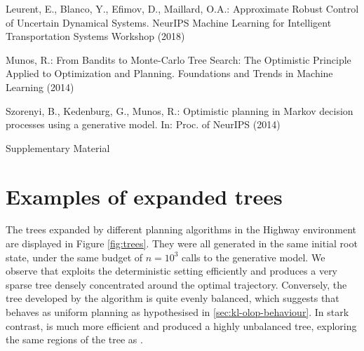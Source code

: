 \documentclass[runningheads]{llncs}
\begin{document}
\begin{thebibliography}{10}
Leurent, E., Blanco, Y., Efimov, D., Maillard, O.A.: {Approximate Robust
  Control of Uncertain Dynamical Systems}. NeurIPS Machine Learning for
  Intelligent Transportation Systems Workshop  (2018)

Munos, R.: {From Bandits to Monte-Carlo Tree Search: The Optimistic Principle
  Applied to Optimization and Planning}. Foundations and
  Trends{\textregistered} in Machine Learning  (2014)

Szorenyi, B., Kedenburg, G., Munos, R.: {Optimistic planning in Markov decision
  processes using a generative model}. In: Proc. of NeurIPS (2014)

\end{thebibliography}

\newpage
\appendix
\begin{center}
    \Large Supplementary Material
\end{center}

\section{Examples of expanded trees}

The trees expanded by different planning algorithms in the Highway environment are displayed in Figure \ref{fig:trees}. They were all generated in the same initial root state, under the same budget of $n=10^3$ calls to the generative model. We observe that \ODP exploits the deterministic setting efficiently and produces a very sparse tree densely concentrated around the optimal trajectory. Conversely, the tree developed by the \OLOP algorithm is quite evenly balanced, which suggests that \OLOP behaves as uniform planning as hypothesised in \ref{sec:kl-olop-behaviour}. In stark contrast, \KLOLOP is much more efficient and produced a highly unbalanced tree, exploring the same regions of the tree as \ODP. 
\end{document}
